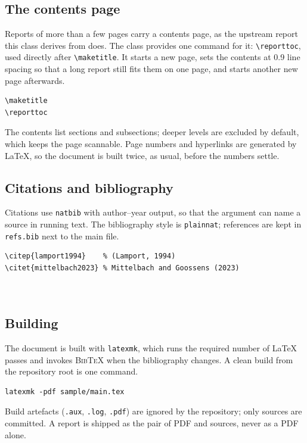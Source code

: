 \subsection{The contents page}

Reports of more than a few pages carry a contents page, as the upstream report this class derives
from does. The class provides one command for it: \verb|\reporttoc|, used directly after
\verb|\maketitle|. It starts a new page, sets the contents at 0.9 line spacing so that a long
report still fits them on one page, and starts another new page afterwards.

\begin{verbatim}
\maketitle
\reporttoc
\end{verbatim}

The contents list sections and subsections; deeper levels are excluded by default, which keeps
the page scannable. Page numbers and hyperlinks are generated by \LaTeX{}, so the document is
built twice, as usual, before the numbers settle.

\subsection{Citations and bibliography}

Citations use \texttt{natbib} with author--year output, so that the argument can name a source
in running text. The bibliography style is \texttt{plainnat}; references are kept in
\texttt{refs.bib} next to the main file.

\begin{verbatim}
\citep{lamport1994}    % (Lamport, 1994)
\citet{mittelbach2023} % Mittelbach and Goossens (2023)



\end{verbatim}

\subsection{Building}

The document is built with \texttt{latexmk}, which runs the required number of \LaTeX{}
passes and invokes \textsc{BibTeX} when the bibliography changes. A clean build from the
repository root is one command.

\begin{verbatim}
latexmk -pdf sample/main.tex
\end{verbatim}

Build artefacts (\texttt{.aux}, \texttt{.log}, \texttt{.pdf}) are ignored by the repository;
only sources are committed. A report is shipped as the pair of PDF and sources, never as a PDF
alone.
